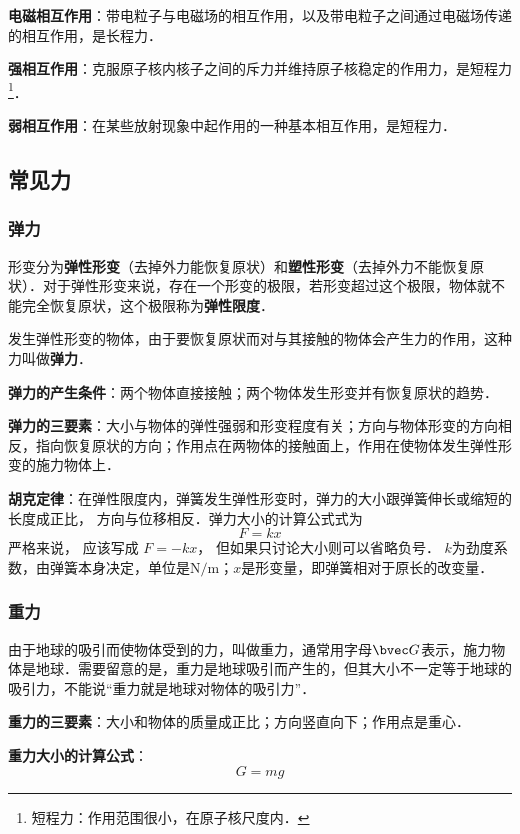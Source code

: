 \textbf{电磁相互作用}：带电粒子与电磁场的相互作用，以及带电粒子之间通过电磁场传递的相互作用，是长程力．

\textbf{强相互作用}：克服原子核内核子之间的斥力并维持原子核稳定的作用力，是短程力\footnote{短程力：作用范围很小，在原子核尺度内．}．

\textbf{弱相互作用}：在某些放射现象中起作用的一种基本相互作用，是短程力．

\subsection{常见力}

\subsubsection{弹力}
形变分为\textbf{弹性形变}（去掉外力能恢复原状）和\textbf{塑性形变}（去掉外力不能恢复原状）．对于弹性形变来说，存在一个形变的极限，若形变超过这个极限，物体就不能完全恢复原状，这个极限称为\textbf{弹性限度}．

发生弹性形变的物体，由于要恢复原状而对与其接触的物体会产生力的作用，这种力叫做\textbf{弹力}．

\textbf{弹力的产生条件}：两个物体直接接触；两个物体发生形变并有恢复原状的趋势．

\textbf{弹力的三要素}：大小与物体的弹性强弱和形变程度有关；方向与物体形变的方向相反，指向恢复原状的方向；作用点在两物体的接触面上，作用在使物体发生弹性形变的施力物体上．

\textbf{胡克定律}：在弹性限度内，弹簧发生弹性形变时，弹力的大小跟弹簧伸长或缩短的长度成正比， 方向与位移相反．弹力大小的计算公式式为
\begin{equation}
F=kx
\end{equation}
严格来说， 应该写成 $F=-kx$， 但如果只讨论大小则可以省略负号． $k$为劲度系数，由弹簧本身决定，单位是$\mathrm{N/m}$；$x$是形变量，即弹簧相对于原长的改变量．

\subsubsection{重力}
由于地球的吸引而使物体受到的力，叫做重力，通常用字母$\bvec G$表示，施力物体是地球．需要留意的是，重力是地球吸引而产生的，但其大小不一定等于地球的吸引力，不能说“重力就是地球对物体的吸引力”．

\textbf{重力的三要素}：大小和物体的质量成正比；方向竖直向下；作用点是重心．

\textbf{重力大小的计算公式}：
\begin{equation}
G=mg
\end{equation}

